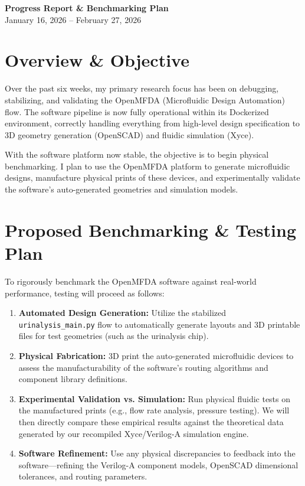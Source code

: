 \documentclass[11pt,a4paper]{article}
\begin{document}
\begin{center}
    {\huge \textbf{\textcolor{primary}{Progress Report \& Benchmarking Plan}}} \\
    \vspace{0.5em}
    {\large January 16, 2026 -- February 27, 2026} \\
    \vspace{1.5em}
\end{center}

\section*{Overview \& Objective}
Over the past six weeks, my primary research focus has been on debugging, stabilizing, and validating the OpenMFDA (Microfluidic Design Automation) flow. The software pipeline is now fully operational within its Dockerized environment, correctly handling everything from high-level design specification to 3D geometry generation (OpenSCAD) and fluidic simulation (Xyce).

With the software platform now stable, the objective is to begin physical benchmarking. I plan to use the OpenMFDA platform to generate microfluidic designs, manufacture physical prints of these devices, and experimentally validate the software's auto-generated geometries and simulation models.

\section*{Proposed Benchmarking \& Testing Plan}
To rigorously benchmark the OpenMFDA software against real-world performance, testing will proceed as follows:

\begin{enumerate}[label=\textbf{\arabic*.}, itemsep=0.4em]
    \item \textbf{Automated Design Generation:} Utilize the stabilized \texttt{urinalysis\_main.py} flow to automatically generate layouts and 3D printable files for test geometries (such as the urinalysis chip).
    \item \textbf{Physical Fabrication:} 3D print the auto-generated microfluidic devices to assess the manufacturability of the software's routing algorithms and component library definitions.
    \item \textbf{Experimental Validation vs. Simulation:} Run physical fluidic tests on the manufactured prints (e.g., flow rate analysis, pressure testing). We will then directly compare these empirical results against the theoretical data generated by our recompiled Xyce/Verilog-A simulation engine.
    \item \textbf{Software Refinement:} Use any physical discrepancies to feedback into the software---refining the Verilog-A component models, OpenSCAD dimensional tolerances, and routing parameters.
\end{enumerate}
\end{document}
